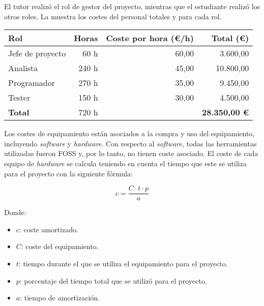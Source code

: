El tutor realizó el rol de gestor del proyecto, mientras que el estudiante
realizó los otros roles. La  muestra los costes del
personal totales y para cada rol.

\begin{table}[htb]
    {
      \begin{tabular}{lrrr}
        \toprule
        \textbf{Rol} & \textbf{Horas} & \textbf{Coste por hora (\euro/h)} & \textbf{Total (\euro)} \\
        \midrule
        Jefe de proyecto &  60 h & 60,00 &  3.600,00 \\
        Analista         & 240 h & 45,00 & 10.800,00 \\
        Programador      & 270 h & 35,00 &  9.450,00 \\
        Tester           & 150 h & 30,00 &  4.500,00 \\
        \midrule
        \textbf{Total}   & 720 h &       & \textbf{28.350,00 \euro} \\
        \bottomrule
      \end{tabular}
    }
\end{table}

Los costes de equipamiento están asociados a la compra y uso del equipamiento,
incluyendo \textit{software} y \textit{hardware}. Con respecto al
\textit{software}, todas las herramientas utilizadas fueron \gls{FOSS} y, por lo
tanto, no tienen coste asociado. El coste de cada equipo de \textit{hardware}
se calcula teniendo en cuenta el tiempo que este se utiliza para el proyecto con
la siguiente fórmula:

\begin{equation}\label{eq:chargeable-cost}
    c = \frac{C \cdot t \cdot p}{a}
\end{equation}

\noindent
Donde:

\begin{itemize}
    \item $c$: coste amortizado.
    \item $C$: coste del equipamiento.
    \item $t$: tiempo durante el que se utiliza el equipamiento para el proyecto.
    \item $p$: porcentaje del tiempo total que se utilizó para el proyecto.
    \item $a$: tiempo de amortización.
\end{itemize}

